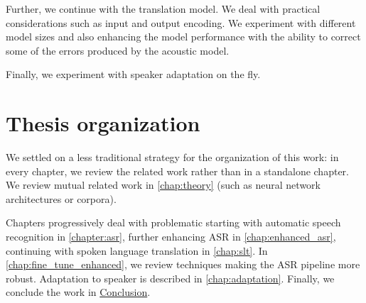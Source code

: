 Further, we continue with the translation model. We deal with practical considerations such as input and output encoding. We experiment with different model sizes and also enhancing the model performance with the ability to correct some of the errors produced by the acoustic model.

Finally, we experiment with speaker adaptation on the fly. 

\section*{Thesis organization}
We settled on a less traditional strategy for the organization of this work: in every chapter, we review the related work rather than in a standalone chapter. We review mutual related work in \cref{chap:theory} (such as neural network architectures or corpora).

Chapters progressively deal with problematic starting with automatic speech recognition in \cref{chapter:asr}, further enhancing ASR in \cref{chap:enhanced_asr}, continuing with spoken language translation in \cref{chap:slt}. In \cref{chap:fine_tune_enhanced}, we review techniques making the ASR pipeline more robust. Adaptation to speaker is described in \cref{chap:adaptation}. Finally, we conclude the work in \hyperref[chap:conclusion]{Conclusion}.

